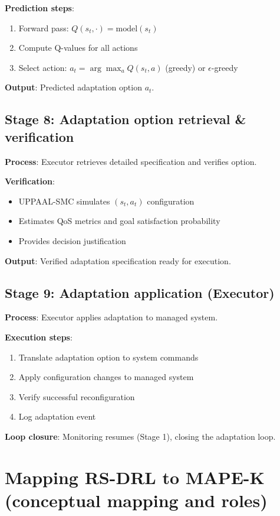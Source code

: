 \documentclass[11pt,a4paper]{article}
\begin{document}
\textbf{Prediction steps}:
\begin{enumerate}
    \item Forward pass: $Q(s_t, \cdot) = \text{model}(s_t)$
    \item Compute Q-values for all actions
    \item Select action: $a_t = \arg\max_a Q(s_t, a)$ (greedy) or $\epsilon$-greedy
\end{enumerate}

\textbf{Output}: Predicted adaptation option $a_t$.

\subsection{Stage 8: Adaptation option retrieval \& verification}

\textbf{Process}: Executor retrieves detailed specification and verifies option.

\textbf{Verification}:
\begin{itemize}
    \item UPPAAL-SMC simulates $(s_t, a_t)$ configuration
    \item Estimates QoS metrics and goal satisfaction probability
    \item Provides decision justification
\end{itemize}

\textbf{Output}: Verified adaptation specification ready for execution.

\subsection{Stage 9: Adaptation application (Executor)}

\textbf{Process}: Executor applies adaptation to managed system.

\textbf{Execution steps}:
\begin{enumerate}
    \item Translate adaptation option to system commands
    \item Apply configuration changes to managed system
    \item Verify successful reconfiguration
    \item Log adaptation event
\end{enumerate}

\textbf{Loop closure}: Monitoring resumes (Stage 1), closing the adaptation loop.

\section{Mapping RS-DRL to MAPE-K (conceptual mapping and roles)}
\end{document}
